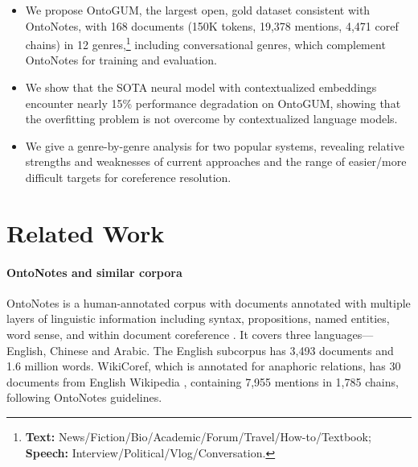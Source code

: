 \documentclass[11pt,a4paper]{article}
\begin{document}
\begin{itemize}
    \item We propose OntoGUM, the largest open, gold dataset consistent with OntoNotes, with 168 documents (150K tokens, 19,378 mentions, 4,471 coref chains) in 12 genres,\footnote{\textbf{Text:} News/Fiction/Bio/Academic/Forum/Travel/How-to/Textbook; \textbf{Speech:} Interview/Political/Vlog/Conversation.} including conversational genres, which complement OntoNotes for training and evaluation.
    
    \item We show that the SOTA neural model with contextualized embeddings encounter nearly 15\% performance degradation on OntoGUM, showing that the overfitting problem is not overcome by contextualized language models.
    
    \item We give a genre-by-genre analysis for two popular systems, revealing relative strengths and weaknesses of current approaches and the range of easier/more difficult targets for coreference resolution.
    


\end{itemize}

\section{Related Work}











\paragraph{OntoNotes and similar corpora}
OntoNotes is a human-annotated corpus with documents annotated with multiple layers of linguistic information including syntax, propositions, named entities, word sense, and within document coreference \citep{weischedel-handbook-2011-ontonotes,pradhan-etal-2013-towards}.  It covers three languages---English, Chinese and Arabic. The English subcorpus has 3,493 documents and 1.6 million words. WikiCoref, which is annotated for anaphoric relations, has 30 documents from English Wikipedia \cite{ghaddar-langlais-2016-wikicoref}, containing 7,955 mentions in 1,785 chains, following OntoNotes guidelines.
\end{document}
